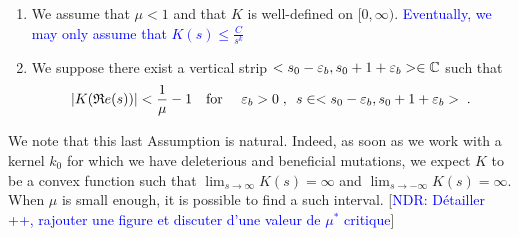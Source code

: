 \documentclass[11pt]{amsart}
\renewcommand{\Re}{\mathfrak{R}e}
\newcommand{\blue}[1]{\textcolor{blue}{#1}}
\begin{document}
\begin{hypothesis}\label{hyp:boundK}
    \begin{enumerate}
        \item We assume that $\mu < 1$ and that $K$ is well-defined on $[0, \infty)$.  \blue{Eventually, we may only assume that $K(s) \leq \frac{C}{s^k}$} 
        \item We suppose there exist a vertical strip $<s_0-\varepsilon_b, s_0+1+\varepsilon_b> \in \mathbb{C}$ such that 
        $$|K(\Re(s))| < \frac{1}{\mu} - 1
        \mtext{for } \varepsilon_b > 0 \eqsepv s \in <s_0-\varepsilon_b, s_0+1+\varepsilon_b>\eqfinp$$ 
    \end{enumerate}
\end{hypothesis}
We note that this last Assumption is natural. Indeed, as soon as we work with a kernel $k_0$ for which we have deleterious and beneficial mutations, we expect $K$ to be a convex function such that $\lim_{s \to \infty} K(s) = \infty$ and $\lim_{s \to -\infty} K(s) = \infty$. When $\mu$ is small enough, it is possible to find a such interval. [\blue{NDR: Détailler ++, rajouter une figure et discuter d'une valeur de $\mu^* $ critique}]
\end{document}
